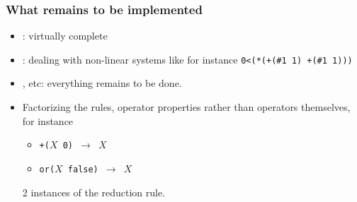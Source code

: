 \documentclass{beamer}
\begin{document}
\frame
{
  \frametitle{What remains to be implemented}

  \begin{itemize}
  \item<+-> :
    virtually \alert{complete}
  \item<+-> :
    dealing with \alert{non-linear systems}
    like for instance {\tt 0<(*(+(\#1 1) +(\#1 1)))}
  \item<+-> , etc:
    \alert{everything} remains to be done.
  \item<+-> Factorizing the rules, operator properties rather than
    operators themselves, for instance 
    \begin{itemize}
    \item {\tt +($X$ 0) $\rightarrow$ $X$}
    \item {\tt or($X$ false) $\rightarrow$ $X$}
    \end{itemize}
    2 instances of the {\it {}} reduction rule.
  \end{itemize}
}
\end{document}
